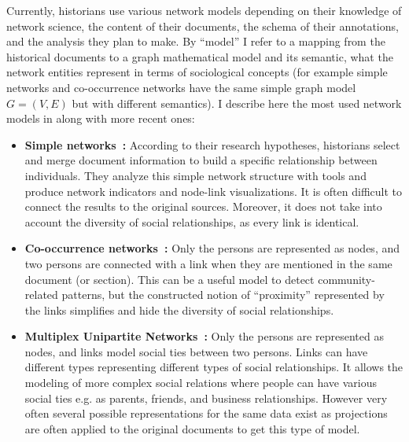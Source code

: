 Currently, historians use various network models depending on their knowledge of network science, the content of their documents, the schema of their annotations, and the analysis they plan to make. By ``model'' I refer to a mapping from the historical documents to a graph mathematical model and its semantic, \ie what the network entities represent in terms of sociological concepts (for example simple networks and co-occurrence networks have the same simple graph model $G = (V, E)$ but with different semantics).
I describe here the most used network models in \hsna along with more recent ones:

\begin{itemize}[nosep,leftmargin=*]
    \item \textbf{Simple networks~\cite{wetherellHistoricalSocialNetwork1998}:} According to their research hypotheses, historians select and merge document information to build a specific relationship between individuals. They analyze this simple network structure with \sna tools and produce network indicators and node-link visualizations. It is often difficult to connect the results to the original sources. Moreover, it does not take into account the diversity of social relationships, as every link is identical.
    \item \textbf{Co-occurrence networks~\cite{sairioMethodologicalPracticalAspects2009}:}
    Only the persons are represented as nodes, and two persons are connected with a link when they are mentioned in the same document (or section). This can be a useful model to detect community-related patterns, but the constructed notion of ``proximity'' represented by the links simplifies and hide the diversity of social relationships.
    \item \textbf{Multiplex Unipartite Networks~\cite{eriksonMalfeasanceFoundationsGlobal2006}:} Only the persons are represented as nodes, and links model social ties between two persons. Links can have different types representing different types of social relationships. It allows the modeling of more complex social relations where people can have various social ties e.g. as parents, friends, and business relationships. However very often several possible representations for the same data exist as projections are often applied to the original documents to get this type of model.

\end{itemize}
